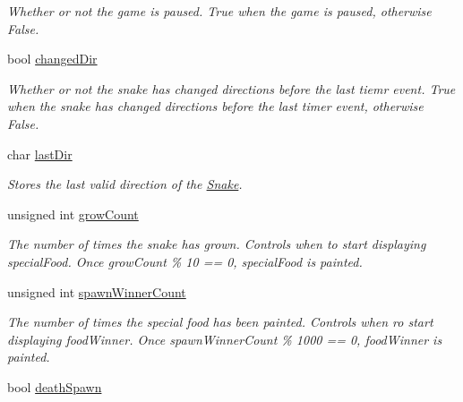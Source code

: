 \begin{DoxyCompactItemize}
\begin{DoxyCompactList}\small\item\em \-Whether or not the game is paused. \-True when the game is paused, otherwise \-False. \end{DoxyCompactList}\item 
\hypertarget{classGame_a505ba53ef639736e8a4edb222de00f82}{bool \hyperlink{classGame_a505ba53ef639736e8a4edb222de00f82}{changed\-Dir}}\label{classGame_a505ba53ef639736e8a4edb222de00f82}

\begin{DoxyCompactList}\small\item\em \-Whether or not the snake has changed directions before the last tiemr event. \-True when the snake has changed directions before the last timer event, otherwise \-False. \end{DoxyCompactList}\item 
\hypertarget{classGame_af62d7b5c18f6cdd90dd80f98cb783bd9}{char \hyperlink{classGame_af62d7b5c18f6cdd90dd80f98cb783bd9}{last\-Dir}}\label{classGame_af62d7b5c18f6cdd90dd80f98cb783bd9}

\begin{DoxyCompactList}\small\item\em \-Stores the last valid direction of the \hyperlink{classSnake}{\-Snake}. \end{DoxyCompactList}\item 
\hypertarget{classGame_ae2a3b6bed2a17912ba8722958d5e0caa}{unsigned int \hyperlink{classGame_ae2a3b6bed2a17912ba8722958d5e0caa}{grow\-Count}}\label{classGame_ae2a3b6bed2a17912ba8722958d5e0caa}

\begin{DoxyCompactList}\small\item\em \-The number of times the snake has grown. \-Controls when to start displaying special\-Food. \-Once grow\-Count \% 10 == 0, special\-Food is painted. \end{DoxyCompactList}\item 
\hypertarget{classGame_ac0bd70f6892c174d1d7c65150e9c6fb5}{unsigned int \hyperlink{classGame_ac0bd70f6892c174d1d7c65150e9c6fb5}{spawn\-Winner\-Count}}\label{classGame_ac0bd70f6892c174d1d7c65150e9c6fb5}

\begin{DoxyCompactList}\small\item\em \-The number of times the special food has been painted. \-Controls when ro start displaying food\-Winner. \-Once spawn\-Winner\-Count \% 1000 == 0, food\-Winner is painted. \end{DoxyCompactList}\item 
\hypertarget{classGame_a4807181a3e27197af61277273aae86b4}{bool \hyperlink{classGame_a4807181a3e27197af61277273aae86b4}{death\-Spawn}}\label{classGame_a4807181a3e27197af61277273aae86b4}


\end{DoxyCompactItemize}
